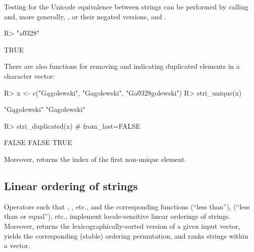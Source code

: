 \documentclass[nojss]{jss}
\begin{document}
Testing for the Unicode equivalence between strings
can be performed by calling  and, more generally,
, or their negated versions,
 and .

\begin{Schunk}
\begin{Sinput}
R> "a\u0328" %s==% "ą"             # a, ogonek == a with ogonek
\end{Sinput}
\begin{Soutput}
[1] TRUE
\end{Soutput}
\end{Schunk}



There are also functions for removing and indicating
duplicated elements in a character vector:

\begin{Schunk}
\begin{Sinput}
R> x <- c("Gągolewski", "Gagolewski", "Ga\u0328golewski")
R> stri_unique(x)
\end{Sinput}
\begin{Soutput}
[1] "Gągolewski" "Gagolewski"
\end{Soutput}
\begin{Sinput}
R> stri_duplicated(x)  # from_last=FALSE
\end{Sinput}
\begin{Soutput}
[1] FALSE FALSE  TRUE
\end{Soutput}
\end{Schunk}

Moreover, 
returns the index of the first non-unique element.






\subsection{Linear ordering of strings}



Operators such that , \code{\%<=\%}, etc.,
and the corresponding functions
 (``less than''),
 (``less than or equal''), etc.,
implement locale-sensitive linear orderings of strings.
Moreover,  returns the lexicographically-sorted
version of a given input vector,  yields
the corresponding (stable) ordering permutation,
and  ranks strings within a vector.
\end{document}
